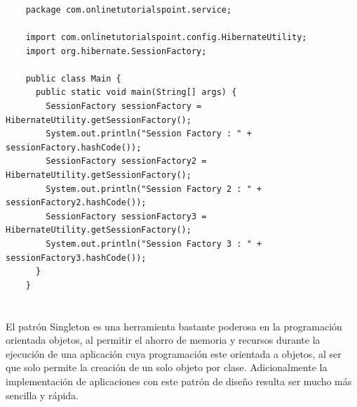 \documentclass[10pt,a4paper]{article} %
\begin{document}
\pagebreak

\subsubsection{\color{colorESCOM}{Main.java}}

    \begin{lstlisting}
    package com.onlinetutorialspoint.service;
    
    import com.onlinetutorialspoint.config.HibernateUtility;
    import org.hibernate.SessionFactory;
    
    public class Main {
      public static void main(String[] args) {
        SessionFactory sessionFactory = HibernateUtility.getSessionFactory();
        System.out.println("Session Factory : " + sessionFactory.hashCode());
        SessionFactory sessionFactory2 = HibernateUtility.getSessionFactory();
        System.out.println("Session Factory 2 : " + sessionFactory2.hashCode());
        SessionFactory sessionFactory3 = HibernateUtility.getSessionFactory();
        System.out.println("Session Factory 3 : " + sessionFactory3.hashCode());
      }
    }
    \end{lstlisting} 

\pagebreak

\section{}
{\large El patr{\' o}n Singleton es una herramienta bastante poderosa en la programaci{\' o}n orientada objetos, al permitir el ahorro de memoria y recursos durante la ejecuci{\' o}n de una aplicaci{\' o}n cuya programaci{\' o}n este orientada a objetos, al ser que solo permite la creaci{\' o}n de un solo objeto por clase. Adicionalmente la implementaci{\' o}n de aplicaciones con este patr{\' o}n de dise{\~ n}o resulta ser mucho m{\' a}s sencilla y r{\' a}pida.}


\pagebreak

\end{document}
